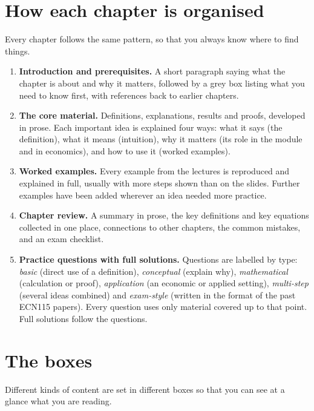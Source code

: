 \section*{How each chapter is organised}
Every chapter follows the same pattern, so that you always know where to find things.
\begin{enumerate}[label=\arabic*.]
  \item \textbf{Introduction and prerequisites.} A short paragraph saying what the chapter is about and
  why it matters, followed by a grey box listing what you need to know first, with references back to
  earlier chapters.
  \item \textbf{The core material.} Definitions, explanations, results and proofs, developed in prose.
  Each important idea is explained four ways: what it says (the definition), what it means (intuition),
  why it matters (its role in the module and in economics), and how to use it (worked examples).
  \item \textbf{Worked examples.} Every example from the lectures is reproduced and explained in full,
  usually with more steps shown than on the slides. Further examples have been added wherever an idea
  needed more practice.
  \item \textbf{Chapter review.} A summary in prose, the key definitions and key equations collected
  in one place, connections to other chapters, the common mistakes, and an exam checklist.
  \item \textbf{Practice questions with full solutions.} Questions are labelled by type:
  \emph{basic} (direct use of a definition), \emph{conceptual} (explain why), \emph{mathematical}
  (calculation or proof), \emph{application} (an economic or applied setting), \emph{multi-step}
  (several ideas combined) and \emph{exam-style} (written in the format of the past ECN115 papers).
  Every question uses only material covered up to that point. Full solutions follow the questions.
\end{enumerate}

\section*{The boxes}
Different kinds of content are set in different boxes so that you can see at a glance what you are
reading.

